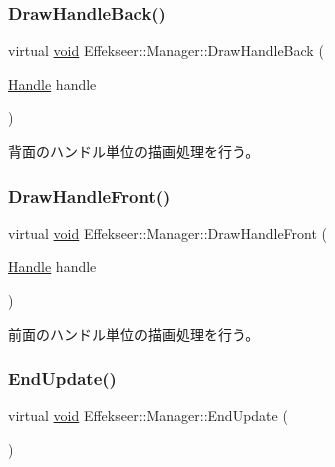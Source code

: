 \subsubsection{\texorpdfstring{Draw\+Handle\+Back()}{DrawHandleBack()}}
{\footnotesize\ttfamily virtual \mbox{\hyperlink{namespace_effekseer_ab34c4088e512200cf4c2716f168deb56}{void}} Effekseer\+::\+Manager\+::\+Draw\+Handle\+Back (\begin{DoxyParamCaption}\item[{\mbox{\hyperlink{namespace_effekseer_afba58b8d812da862190e9bbfc040824a}{Handle}}}]{handle }\end{DoxyParamCaption})\hspace{0.3cm}{\ttfamily [pure virtual]}}



背面のハンドル単位の描画処理を行う。 

\mbox{\label{class_effekseer_1_1_manager_a684708df101f9fdcf81096dcb058bce2}} 
\subsubsection{\texorpdfstring{Draw\+Handle\+Front()}{DrawHandleFront()}}
{\footnotesize\ttfamily virtual \mbox{\hyperlink{namespace_effekseer_ab34c4088e512200cf4c2716f168deb56}{void}} Effekseer\+::\+Manager\+::\+Draw\+Handle\+Front (\begin{DoxyParamCaption}\item[{\mbox{\hyperlink{namespace_effekseer_afba58b8d812da862190e9bbfc040824a}{Handle}}}]{handle }\end{DoxyParamCaption})\hspace{0.3cm}{\ttfamily [pure virtual]}}



前面のハンドル単位の描画処理を行う。 

\mbox{\label{class_effekseer_1_1_manager_a49311566caa5abcbff1b836473b046ab}} 
\subsubsection{\texorpdfstring{End\+Update()}{EndUpdate()}}
{\footnotesize\ttfamily virtual \mbox{\hyperlink{namespace_effekseer_ab34c4088e512200cf4c2716f168deb56}{void}} Effekseer\+::\+Manager\+::\+End\+Update (\begin{DoxyParamCaption}{ }\end{DoxyParamCaption})\hspace{0.3cm}{\ttfamily [pure virtual]}}



